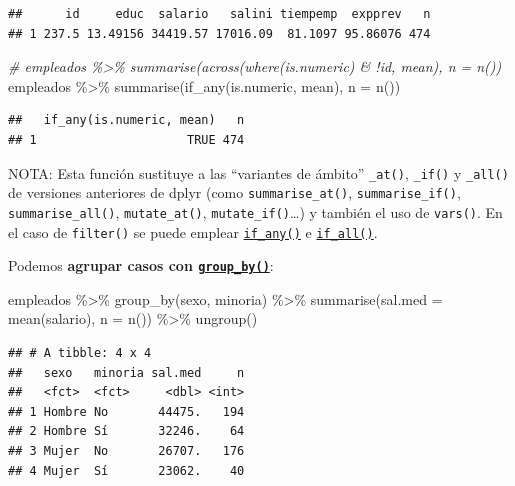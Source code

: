 \documentclass[
]{book}
\newenvironment{Shaded}{\begin{snugshade}}{\end{snugshade}}
\newcommand{\AttributeTok}[1]{\textcolor[rgb]{0.77,0.63,0.00}{#1}}
\newcommand{\CommentTok}[1]{\textcolor[rgb]{0.56,0.35,0.01}{\textit{#1}}}
\newcommand{\FunctionTok}[1]{\textcolor[rgb]{0.00,0.00,0.00}{#1}}
\newcommand{\NormalTok}[1]{#1}
\newcommand{\SpecialCharTok}[1]{\textcolor[rgb]{0.00,0.00,0.00}{#1}}
\theoremstyle{break}
\theoremstyle{nonumberplain}
\begin{document}
\begin{verbatim}
##      id     educ  salario   salini tiempemp  expprev   n
## 1 237.5 13.49156 34419.57 17016.09  81.1097 95.86076 474
\end{verbatim}

\begin{Shaded}
\begin{Highlighting}[]
\CommentTok{\# empleados \%\textgreater{}\% summarise(across(where(is.numeric) \& !id, mean), n = n())}
\NormalTok{empleados }\SpecialCharTok{\%\textgreater{}\%} \FunctionTok{summarise}\NormalTok{(}\FunctionTok{if\_any}\NormalTok{(is.numeric, mean), }\AttributeTok{n =} \FunctionTok{n}\NormalTok{())}
\end{Highlighting}
\end{Shaded}

\begin{verbatim}
##   if_any(is.numeric, mean)   n
## 1                     TRUE 474
\end{verbatim}

NOTA: Esta función sustituye a las ``variantes de ámbito'' \texttt{\_at()}, \texttt{\_if()} y \texttt{\_all()} de versiones anteriores de dplyr (como \texttt{summarise\_at()}, \texttt{summarise\_if()}, \texttt{summarise\_all()}, \texttt{mutate\_at()}, \texttt{mutate\_if()}\ldots) y también el uso de \texttt{vars()}.
En el caso de \texttt{filter()} se puede emplear \href{https://dplyr.tidyverse.org/reference/across.html}{\texttt{if\_any()}} e \href{https://dplyr.tidyverse.org/reference/across.html}{\texttt{if\_all()}}.

Podemos \textbf{agrupar casos con \href{https://dplyr.tidyverse.org/reference/group_by.html}{\texttt{group\_by()}}}:

\begin{Shaded}
\begin{Highlighting}[]
\NormalTok{empleados }\SpecialCharTok{\%\textgreater{}\%} \FunctionTok{group\_by}\NormalTok{(sexo, minoria) }\SpecialCharTok{\%\textgreater{}\%} 
    \FunctionTok{summarise}\NormalTok{(}\AttributeTok{sal.med =} \FunctionTok{mean}\NormalTok{(salario), }\AttributeTok{n =} \FunctionTok{n}\NormalTok{()) }\SpecialCharTok{\%\textgreater{}\%}
    \FunctionTok{ungroup}\NormalTok{()}
\end{Highlighting}
\end{Shaded}

\begin{verbatim}
## # A tibble: 4 x 4
##   sexo   minoria sal.med     n
##   <fct>  <fct>     <dbl> <int>
## 1 Hombre No       44475.   194
## 2 Hombre Sí       32246.    64
## 3 Mujer  No       26707.   176
## 4 Mujer  Sí       23062.    40
\end{verbatim}
\end{document}
